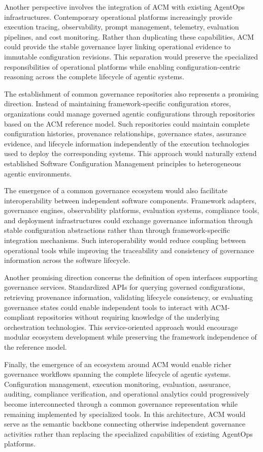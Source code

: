 \documentclass[10pt]{article}
\begin{document}
Another perspective involves the integration of ACM with existing AgentOps infrastructures. Contemporary operational platforms increasingly provide execution tracing, observability, prompt management, telemetry, evaluation pipelines, and cost monitoring. Rather than duplicating these capabilities, ACM could provide the stable governance layer linking operational evidence to immutable configuration revisions. This separation would preserve the specialized responsibilities of operational platforms while enabling configuration-centric reasoning across the complete lifecycle of agentic systems.

The establishment of common governance repositories also represents a promising direction. Instead of maintaining framework-specific configuration stores, organizations could manage governed agentic configurations through repositories based on the ACM reference model. Such repositories could maintain complete configuration histories, provenance relationships, governance states, assurance evidence, and lifecycle information independently of the execution technologies used to deploy the corresponding systems. This approach would naturally extend established Software Configuration Management principles to heterogeneous agentic environments.

The emergence of a common governance ecosystem would also facilitate interoperability between independent software components. Framework adapters, governance engines, observability platforms, evaluation systems, compliance tools, and deployment infrastructures could exchange governance information through stable configuration abstractions rather than through framework-specific integration mechanisms. Such interoperability would reduce coupling between operational tools while improving the traceability and consistency of governance information across the software lifecycle.

Another promising direction concerns the definition of open interfaces supporting governance services. Standardized APIs for querying governed configurations, retrieving provenance information, validating lifecycle consistency, or evaluating governance states could enable independent tools to interact with ACM-compliant repositories without requiring knowledge of the underlying orchestration technologies. This service-oriented approach would encourage modular ecosystem development while preserving the framework independence of the reference model.

Finally, the emergence of an ecosystem around ACM would enable richer governance workflows spanning the complete lifecycle of agentic systems. Configuration management, execution monitoring, evaluation, assurance, auditing, compliance verification, and operational analytics could progressively become interconnected through a common governance representation while remaining implemented by specialized tools. In this architecture, ACM would serve as the semantic backbone connecting otherwise independent governance activities rather than replacing the specialized capabilities of existing AgentOps platforms.
\end{document}
